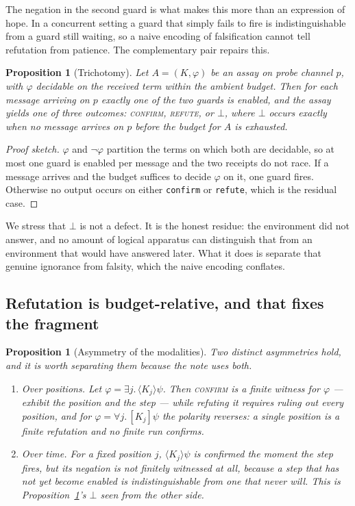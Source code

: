 \documentclass[11pt]{article}
\theoremstyle{plain}
\newtheorem{proposition}[theorem]{Proposition}
\theoremstyle{definition}
\begin{document}
The negation in the second guard is what makes this more than an expression of hope. In a concurrent
setting a guard that simply fails to fire is indistinguishable from a guard still waiting, so a naive
encoding of falsification cannot tell refutation from patience. The complementary pair repairs this.

\begin{proposition}[Trichotomy]
\label{prop:trichotomy}
Let $A = (K,\varphi)$ be an assay on probe channel $p$, with $\varphi$ decidable on the received term
within the ambient budget. Then for each message arriving on $p$ exactly one of the two guards is
enabled, and the assay yields one of three outcomes: \textsc{confirm}, \textsc{refute}, or $\bot$,
where $\bot$ occurs exactly when no message arrives on $p$ before the budget for $A$ is exhausted.
\end{proposition}

\begin{proof}[Proof sketch]
$\varphi$ and $\lnot\varphi$ partition the terms on which both are decidable, so at most one guard is
enabled per message and the two receipts do not race. If a message arrives and the budget suffices to
decide $\varphi$ on it, one guard fires. Otherwise no output occurs on either \texttt{confirm} or
\texttt{refute}, which is the residual case.
\end{proof}

We stress that $\bot$ is not a defect. It is the honest residue: the environment did not answer, and
no amount of logical apparatus can distinguish that from an environment that would have answered
later. What it does is separate that genuine ignorance from falsity, which the naive encoding conflates.

\subsection{Refutation is budget-relative, and that fixes the fragment}

\begin{proposition}[Asymmetry of the modalities]
\label{prop:asymmetry}
Two distinct asymmetries hold, and it is worth separating them because the note uses both.
\begin{enumerate}
\item \emph{Over positions.} Let $\varphi = \exists j.\,\langle K_j \rangle \psi$. Then
\textsc{confirm} is a finite witness for $\varphi$ --- exhibit the position and the step --- while
refuting it requires ruling out every position, and for $\varphi = \forall j.\,[K_j]\psi$ the
polarity reverses: a single position is a finite refutation and no finite run confirms.
\item \emph{Over time.} For a fixed position $j$, $\langle K_j\rangle\psi$ is confirmed the moment
the step fires, but its negation is not finitely witnessed at all, because a step that has not yet
become enabled is indistinguishable from one that never will. This is Proposition~\ref{prop:trichotomy}'s
$\bot$ seen from the other side.
\end{enumerate}
\end{proposition}
\end{document}
